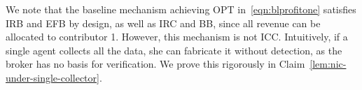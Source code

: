 \vspace{0.04in}
\noindent
We note that the baseline mechanism achieving OPT in~\eqref{eqn:blprofitone} satisfies IRB and EFB by design, as well as IRC and BB, since all revenue can be allocated to contributor 1. However, this mechanism is not ICC.
Intuitively, if a single agent collects all the data, she can fabricate it without detection, as the broker has no basis for verification.  
We prove this rigorously in Claim~\ref{lem:nic-under-single-collector}. 









